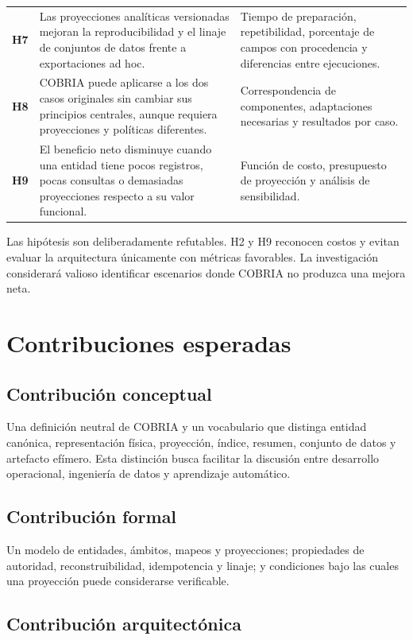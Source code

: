 \begin{longtable}{>{\bfseries}p{1.6cm}p{5.2cm}p{7.1cm}}
H7 & Las proyecciones analíticas versionadas mejoran la reproducibilidad y el linaje de
conjuntos de datos frente a exportaciones ad hoc. & Tiempo de preparación, repetibilidad,
porcentaje de campos con procedencia y diferencias entre ejecuciones. \\
H8 & COBRIA puede aplicarse a los dos casos originales sin cambiar sus principios
centrales, aunque requiera proyecciones y políticas diferentes. & Correspondencia de
componentes, adaptaciones necesarias y resultados por caso. \\
H9 & El beneficio neto disminuye cuando una entidad tiene pocos registros, pocas
consultas o demasiadas proyecciones respecto a su valor funcional. & Función de costo,
presupuesto de proyección y análisis de sensibilidad. \\
\bottomrule
\end{longtable}

Las hipótesis son deliberadamente refutables. H2 y H9 reconocen costos y evitan evaluar
la arquitectura únicamente con métricas favorables. La investigación considerará
valioso identificar escenarios donde COBRIA no produzca una mejora neta.

\section{Contribuciones esperadas}

\subsection{Contribución conceptual}

Una definición neutral de COBRIA y un vocabulario que distinga entidad canónica,
representación física, proyección, índice, resumen, conjunto de datos y artefacto efímero. Esta
distinción busca facilitar la discusión entre desarrollo operacional, ingeniería de
datos y aprendizaje automático.

\subsection{Contribución formal}

Un modelo de entidades, ámbitos, mapeos y proyecciones; propiedades de autoridad,
reconstruibilidad, idempotencia y linaje; y condiciones bajo las cuales una proyección
puede considerarse verificable.

\subsection{Contribución arquitectónica}

